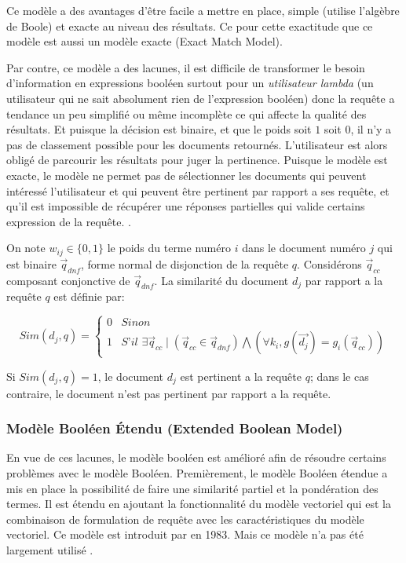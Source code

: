 Ce modèle a des avantages d'être facile a mettre en place, simple (utilise l'algèbre de Boole) et exacte au niveau des résultats. Ce pour cette exactitude que ce modèle est aussi un modèle exacte (Exact Match Model).

Par contre, ce modèle a des lacunes, il est difficile de transformer le besoin d'information en expressions booléen surtout pour un \emph{utilisateur lambda} (un utilisateur qui ne sait absolument rien de l'expression booléen) donc la requête a tendance un peu simplifié ou même incomplète ce qui affecte la qualité des résultats. Et puisque la décision est binaire, et que le poids soit $1$ soit $0$, il n'y a pas de classement possible pour les documents retournés. L'utilisateur est alors obligé de parcourir les résultats pour juger la pertinence. Puisque le modèle est exacte, le modèle ne permet pas de sélectionner les documents qui peuvent intéressé l'utilisateur et qui peuvent être pertinent par rapport a ses requête, et qu'il est impossible de récupérer une réponses partielles qui valide certains expression de la requête. \citep*{modern-ir, soulier2014:def-evaluation-modele}.

\begin{definition}
    On note $w_{ij} \in \{0, 1\}$ le poids du terme numéro $i$ dans le document numéro $j$ qui est binaire $ \vec{q}_{dnf} $, forme normal de disjonction de la requête $ q $. Considérons $ \vec{q}_{cc} $ composant conjonctive de $ \vec{q}_{dnf} $. La similarité du document $ d_{j} $ par rapport a la requête $ q $ est définie par:

    \[
        Sim(d_{j}, q) = \left\{
        \begin{array}{ll}
            0 & Sinon \\
            1 & \textit{S'il } \exists \vec{q}_{cc} \mid (\vec{q}_{cc} \in \vec{q}_{dnf}) \bigwedge (\forall k_{i}, g(\vec{d_{j}}) = g_{i}(\vec{q}_{cc}))
        \end{array}
        \right.
    \]

    Si $ Sim(d_{j}, q) = 1$, le document $ d_{j} $ est pertinent a la requête $ q $; dans le cas contraire, le document n'est pas pertinent par rapport a la requête.
\end{definition}

\subsubsection{Modèle Booléen Étendu (Extended Boolean Model)}
En vue de ces lacunes, le modèle booléen est amélioré afin de résoudre certains problèmes avec le modèle Booléen. Premièrement, le modèle Booléen étendue a mis en place la possibilité de faire une similarité partiel et la pondération des termes. Il est étendu en ajoutant la fonctionnalité du modèle vectoriel qui est la combinaison de formulation de requête avec les caractéristiques du modèle vectoriel. Ce modèle est introduit par \citeauthor{salton1983étendu} \citep{salton1983étendu} en 1983. Mais ce modèle n'a pas été largement utilisé \citep{modern-ir}.

